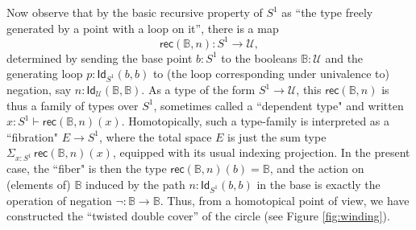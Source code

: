 \documentclass[11pt]{article}
\newcommand{\B}{\ensuremath{\mathbb{B}}}
\newcommand{\Id}{\mathsf{Id}}
\newcommand{\id}[1]{\Id_{#1}}
\newcommand{\rec}{\mathsf{rec}}
\newcommand{\U}{\ensuremath{\mathcal{U}}}
\theoremstyle{remark}
\theoremstyle{definition}
\begin{document}
Now observe that by the basic recursive property of $S^1$ as ``the type freely generated by a point with a loop on it'', there is a map $$\rec(\B,n): S^1 \to \U,$$ determined by sending the base point $b:S^1$ to the booleans $\B:\U$ and the generating loop $p : \id{S^1}(b,b)$ to (the loop corresponding under univalence to) negation, say $n : \id{\U}(\B,\B)$.  As a type of the form $S^1\to\U$, this $\rec(\B,n)$ is thus a family of types over $S^1$, sometimes called a ``dependent type" and written $x:S^1 \vdash \rec(\B,n)(x)$.  Homotopically, such a type-family is interpreted as a ``fibration" $E\to S^1$, where the total space $E$ is just the sum type $\Sigma_{x:S^1}\,\rec(\B,n)(x)$, equipped with its usual indexing projection.  In the present case, the ``fiber" is then the type $\rec(\B,n)(b) = \B$, and the action on (elements of) $\B$ induced by the path $n: \id{S^1}(b,b)$ in the base is exactly the operation of negation $\neg : \B\to \B$.  Thus, from a homotopical point of view, we have constructed the ``twisted double cover'' of the circle (see Figure \ref{fig:winding}).
%
%
%
\end{document}
